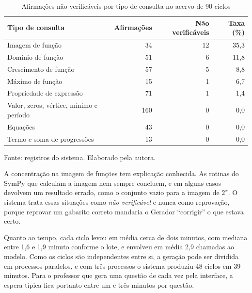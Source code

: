 \begin{table}[htbp]
  \centering
  \caption{Afirmações não verificáveis por tipo de consulta no acervo de 90 ciclos}
  \label{tab:nao-verificavel}
  \begin{tabular}{lrrr}
    \toprule
    Tipo de consulta & Afirmações & Não verificáveis & Taxa (\%) \\
    \midrule
    Imagem de função & 34 & 12 & 35,3 \\
    Domínio de função & 51 & 6 & 11,8 \\
    Crescimento de função & 57 & 5 & 8,8 \\
    Máximo de função & 15 & 1 & 6,7 \\
    Propriedade de expressão & 71 & 1 & 1,4 \\
    Valor, zeros, vértice, mínimo e período & 160 & 0 & 0,0 \\
    Equações & 43 & 0 & 0,0 \\
    Termo e soma de progressões & 13 & 0 & 0,0 \\
    \bottomrule
  \end{tabular}

  \smallskip
  {\footnotesize Fonte: registros do sistema. Elaborado pela autora.}
\end{table}

A concentração na imagem de funções tem explicação conhecida. As rotinas do SymPy que calculam a
imagem nem sempre concluem, e em alguns casos devolvem um resultado errado, como o conjunto vazio
para a imagem de $2^x$. O sistema trata essas situações como \emph{não verificável} e nunca como
reprovação, porque reprovar um gabarito correto mandaria o Gerador ``corrigir'' o que estava certo.

Quanto ao tempo, cada ciclo levou em média cerca de dois minutos, com mediana entre 1,6 e 1,9
minuto conforme o lote, e envolveu em média 2,9 chamadas ao modelo. Como os ciclos são
independentes entre si, a geração pode ser dividida em processos paralelos, e com três processos o
sistema produziu 48 ciclos em 39 minutos. Para o professor que gera uma questão de cada vez pela
interface, a espera típica fica portanto entre um e três minutos por questão.

